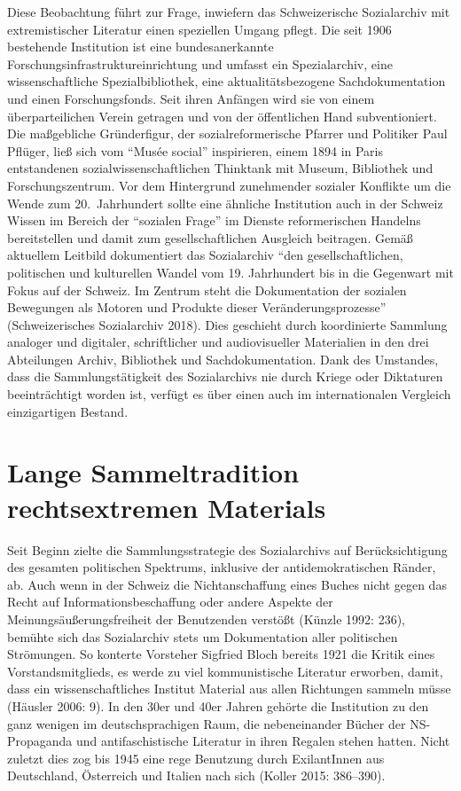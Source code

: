 \documentclass[a4paper,
fontsize=11pt,
oneside,
numbers=noperiodatend,
parskip=half-,
bibliography=totoc,
final
]{scrartcl}
\begin{document}
Diese Beobachtung führt zur Frage, inwiefern das Schweizerische
Sozialarchiv mit extremistischer Literatur einen speziellen Umgang
pflegt. Die seit 1906 bestehende Institution ist eine bundesanerkannte
Forschungsinfrastruktureinrichtung und umfasst ein Spezialarchiv, eine
wissenschaftliche Spezialbibliothek, eine aktualitätsbezogene
Sachdokumentation und einen Forschungsfonds. Seit ihren Anfängen wird
sie von einem überparteilichen Verein getragen und von der öffentlichen
Hand subventioniert. Die maßgebliche Gründerfigur, der
sozialreformerische Pfarrer und Politiker Paul Pflüger, ließ sich vom
\enquote{Musée social} inspirieren, einem 1894 in Paris entstandenen
sozialwissenschaftlichen Thinktank mit Museum, Bibliothek und
Forschungszentrum. Vor dem Hintergrund zunehmender sozialer Konflikte um
die Wende zum 20.~Jahrhundert sollte eine ähnliche Institution auch in
der Schweiz Wissen im Bereich der \enquote{sozialen Frage} im Dienste
reformerischen Handelns bereitstellen und damit zum gesellschaftlichen
Ausgleich beitragen. Gemäß aktuellem Leitbild dokumentiert das
Sozialarchiv \enquote{den gesellschaftlichen, politischen und
kulturellen Wandel vom 19. Jahrhundert bis in die Gegenwart mit Fokus
auf der Schweiz. Im Zentrum steht die Dokumentation der sozialen
Bewegungen als Motoren und Produkte dieser Veränderungsprozesse}
(Schweizerisches Sozialarchiv 2018). Dies geschieht durch koordinierte
Sammlung analoger und digitaler, schriftlicher und audiovisueller
Materialien in den drei Abteilungen Archiv, Bibliothek und
Sachdokumentation. Dank des Umstandes, dass die Sammlungstätigkeit des
Sozialarchivs nie durch Kriege oder Diktaturen beeinträchtigt worden
ist, verfügt es über einen auch im internationalen Vergleich
einzigartigen Bestand.

\hypertarget{lange-sammeltradition-rechtsextremen-materials}{%
\section{Lange Sammeltradition rechtsextremen
Materials}\label{lange-sammeltradition-rechtsextremen-materials}}

Seit Beginn zielte die Sammlungsstrategie des Sozialarchivs auf
Berücksichtigung des gesamten politischen Spektrums, inklusive der
antidemokratischen Ränder, ab. Auch wenn in der Schweiz die
Nichtanschaffung eines Buches nicht gegen das Recht auf
Informationsbeschaffung oder andere Aspekte der
Meinungsäußerungsfreiheit der Benutzenden verstößt (Künzle 1992: 236),
bemühte sich das Sozialarchiv stets um Dokumentation aller politischen
Strömungen. So konterte Vorsteher Sigfried Bloch bereits 1921 die Kritik
eines Vorstandsmitglieds, es werde zu viel kommunistische Literatur
erworben, damit, dass ein wissenschaftliches Institut Material aus allen
Richtungen sammeln müsse (Häusler 2006: 9). In den 30er und 40er Jahren
gehörte die Institution zu den ganz wenigen im deutschsprachigen Raum,
die nebeneinander Bücher der NS-Propaganda und antifaschistische
Literatur in ihren Regalen stehen hatten. Nicht zuletzt dies zog bis
1945 eine rege Benutzung durch ExilantInnen aus Deutschland, Österreich
und Italien nach sich (Koller 2015: 386--390).
\end{document}
